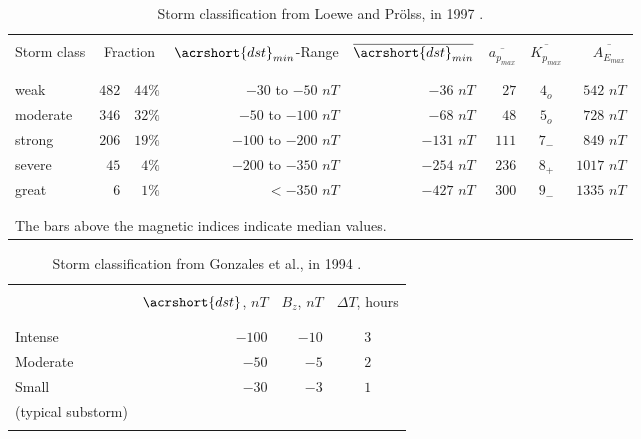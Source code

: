 \documentclass[sn-mathphys-num]{sn-jnl}%
\begin{document}
\begin{table}[!ht]
    \centering
    \caption{Storm classification from Loewe and Prölss, in 1997 \cite{loewe1997classification}.}
    \label{tab:loewe1997}
    \begin{tabular}{lrrrrrcr}
        \hline
        \\
        Storm class & \multicolumn{2}{c}{Fraction} & $\acrshort{dst}_{min}$-Range & $\overline{\acrshort{dst}_{min}}$ & $\overline{a_{p_{max}}}$ & $\overline{K_{p_{max}}}$ & $\overline{A_{E_{max}}}$ \\
        \\
        \hline
        \\
        weak & $482$ & $44\%$ & $-30$ to $-50$ $nT$ & $-36$ $nT$ & $27$ & $4_{o}$ & $542$ $nT$ \\
        moderate & $346$ & $32\%$ & $-50$ to $-100$ $nT$ & $-68$ $nT$ & $48$ & $5_{o}$ & $728$ $nT$ \\
        strong & $206$ & $19\%$ & $-100$ to $-200$ $nT$ & $-131$ $nT$ & $111$ & $7_{-}$ & $849$ $nT$ \\
        severe & $45$ & $4\%$ & $-200$ to $-350$ $nT$ & $-254$ $nT$ & $236$ & $8_{+}$ & $1017$ $nT$ \\
        great & $6$ & $1\%$ & $<-350$ $nT$ & $-427$ $nT$ & $300$ & $9_{-}$ & $1335$ $nT$ \\
        \\
        \hline
        \\
        \multicolumn{8}{l}{The bars above the magnetic indices indicate median values.} \\
    \end{tabular}
\end{table}

\begin{table}[!ht]
    \centering
    \caption{Storm classification from Gonzales et al., in 1994 \cite{gonzalez1994geomagnetic}.}
    \label{tab:gonzalez1994}
    \begin{tabular}{lrrc}
        \hline
        \\
         & $\acrshort{dst}$, $nT$ & $B_{z}$, $nT$ & $\Delta T$, hours \\
        \\
        \hline
        \\
        Intense & $-100$ & $-10$ & $3$ \\
        Moderate & $-50$ & $-5$ & $2$ \\
        Small & $-30$ & $-3$ & $1$ \\
        (typical substorm) & & & \\
        \\
        \hline
    \end{tabular}
\end{table}
\end{document}
